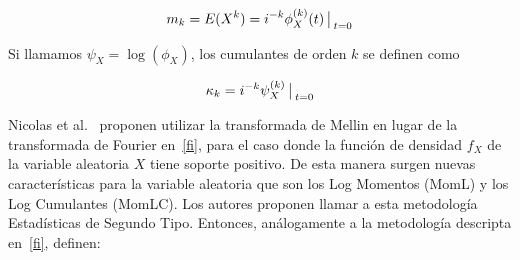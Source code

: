 \begin{align}
\label{MomentosPrimerTipo}
m_k=E(X^k)=i^{-k} \phi_X^{(k)}(t)\big\arrowvert _{t=0}
\end{align}

Si llamamos $\psi_X=\log(\phi_X)$, los cumulantes de orden $k$ se definen como 

\begin{align}
\label{CumulantePrimerTipo}
\kappa_k=i^{-k} \psi_X^{(k)}\big\arrowvert _{t=0}
\end{align}

Nicolas et al.~\cite{nicolas2002} proponen utilizar la transformada de Mellin en lugar de la transformada de Fourier en~\eqref{fi}, para el caso donde la función de densidad $f_X$ de la variable aleatoria $X$ tiene soporte positivo. De esta manera surgen nuevas características para la variable aleatoria que son los Log Momentos (MomL) y los Log Cumulantes (MomLC). Los autores proponen llamar a esta metodología Estadísticas de Segundo Tipo. Entonces, análogamente a la metodología descripta en~\ref{fi}, definen:

